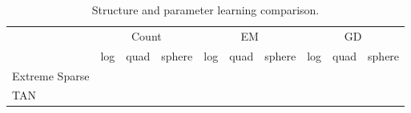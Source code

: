   \begin{table}[]
    \caption{ Structure and parameter learning comparison.}
    \begin{tabular}{@{}llllllllll@{}}
    \toprule
                          & \multicolumn{3}{c}{Count}                                                        & \multicolumn{3}{c}{EM}                                                           & \multicolumn{3}{c}{GD}                                                           \\ \cmidrule(l){2-10} 
    \multicolumn{1}{l|}{} & \multicolumn{1}{c}{log} & \multicolumn{1}{c}{quad} & \multicolumn{1}{c|}{sphere} & \multicolumn{1}{c}{log} & \multicolumn{1}{c}{quad} & \multicolumn{1}{c|}{sphere} & \multicolumn{1}{c}{log} & \multicolumn{1}{c}{quad} & \multicolumn{1}{c|}{sphere} \\ \midrule
    Extreme Sparse        &                         &                          &                             &                         &                          &                             &                         &                          &                             \\
    TAN                   &                         &                          &                             &                         &                          &                             &                         &                          &                             \\ \bottomrule
    \end{tabular}
    \label{table:BNetCompare}
    \end{table}